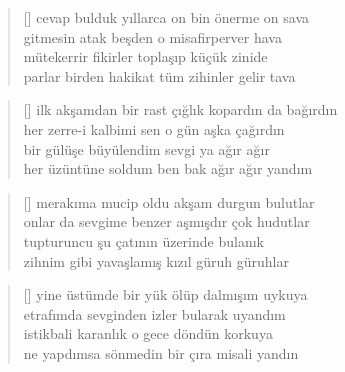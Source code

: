 \documentclass[10pt, openright, twoside]{memoir}
\theoremstyle{definition}
\begin{document}
\settowidth{\versewidth}{parlar birden hakikat tüm zihinler gelir tava}
\begin{verse}[\versewidth]
  cevap bulduk yıllarca on bin önerme on sava \\
  gitmesin atak beşden o misafirperver hava \\
  mütekerrir fikirler toplaşıp küçük zinide \\
  parlar birden hakikat tüm zihinler gelir tava \\
\end{verse}
\vspace*{\fill}
%
\newpage
{}
\vspace*{\fill}
\settowidth{\versewidth}{ilk akşamdan bir rast çığlık kopardın da bağırdın}
\begin{verse}[\versewidth]
  ilk akşamdan bir rast çığlık kopardın da bağırdın \\
  her zerre-i kalbimi sen o gün aşka çağırdın \\
  bir gülüşe büyülendim sevgi ya ağır ağır \\
  her üzüntüne soldum ben bak ağır ağır yandım \\
\end{verse}
\vspace*{\fill}
%
\newpage
{}
\vspace*{\fill}
\settowidth{\versewidth}{onlar da sevgime benzer aşmışdır çok hudutlar}
\begin{verse}[\versewidth]
  merakıma mucip oldu akşam durgun bulutlar \\
  onlar da sevgime benzer aşmışdır çok hudutlar \\
  tupturuncu şu çatının üzerinde bulanık \\
  zihnim gibi yavaşlamış kızıl güruh güruhlar \\
\end{verse}
\vspace*{\fill}
%
\newpage
{}
\vspace*{\fill}
\settowidth{\versewidth}{ne yapdımsa sönmedin bir çıra misali yandın}
\begin{verse}[\versewidth]
  yine üstümde bir yük ölüp dalmışım uykuya \\
  etrafımda sevginden izler bularak uyandım \\
  istikbali karanlık o gece döndün korkuya \\
  ne yapdımsa sönmedin bir çıra misali yandın \\
\end{verse}
\end{document}
